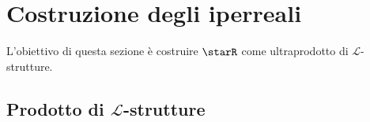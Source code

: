    


\section{Costruzione degli iperreali}

L'obiettivo di questa sezione è costruire $ \starR $ come ultraprodotto di $ \mathcal{L}$-strutture.

\subsection{Prodotto di $ \mathcal{L} $-strutture}

